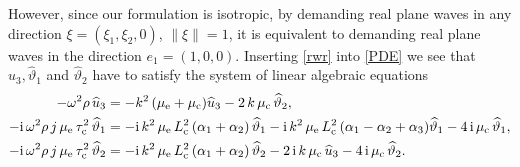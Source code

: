 \documentclass[10pt]{article}
\def\dd{\displaystyle}
\def\dd{\displaystyle}
\begin{document}
However, since our formulation is isotropic, by  demanding real plane waves in any direction $\xi=(\xi_1,\xi_2,0)$, $\lVert \xi\rVert=1$, it is equivalent  {to demanding} real plane waves in the direction $e_1=(1,0,0)$. Inserting  \eqref{rwr} into \eqref{PDE} we see that   $\widehat{u}_3, \widehat{\vartheta}_1$ and $\widehat{\vartheta}_2$ have to satisfy the system of linear  {algebraic} equations
\begin{align}\label{algPDE2}
-\omega^2\rho\, \widehat{u}_3&=-k^2\,(\mu_{\rm e} +\mu_{\rm c})\dd \widehat{u}_3 -2\,k\,\mu_{\rm c}\,\widehat{\vartheta }_2 ,\notag
\vspace{1.2mm}\\
-{\rm i}\,\omega^2\rho\, j\,\mu_{\rm e}\,\tau_{\rm c}^2\,\widehat{ \vartheta }_1&=-{\rm i}\,k^2\,{\mu_{\rm e}\,L_{\rm c}^2}\,(\alpha_1+\alpha_2)\,\widehat{ \vartheta }_1-{\rm i}\,k^2\,{\mu_{\rm e}\,L_{\rm c}^2}\,(\alpha_1-\alpha_2+\alpha_3)\widehat{\vartheta }_1 -4\,{\rm i}\, \mu_{\rm c}\, \widehat{\vartheta }_1,\vspace{1.2mm}\\
-{\rm i}\,\omega^2\rho\, j\,\mu_{\rm e}\,\tau_{\rm c}^2\,\widehat{ \vartheta }_2&=-{\rm i}\,k^2\,{\mu_{\rm e}\,L_{\rm c}^2}\,(\alpha_1+\alpha_2)\,\widehat{ \vartheta }_2-2\,{\rm i}\,k\,\mu_{\rm c}\,\widehat{u}_3 -4\,{\rm i}\, \mu_{\rm c}\, \widehat{\vartheta }_2. \notag
\end{align}
\end{document}
